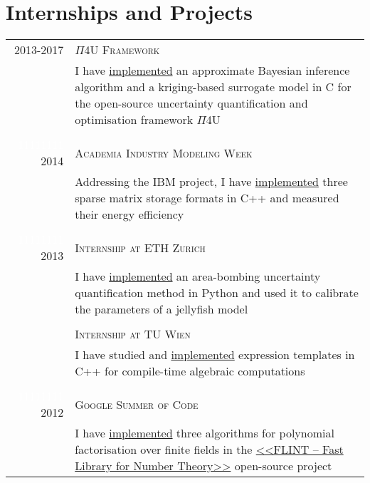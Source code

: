 \documentclass[a4paper,10pt]{article}
\begin{document}
\section{Internships and Projects}
\begin{tabular}{r|p{13cm}}
    2013-2017 & \textsc{$\Pi$4U Framework} \\
    & \footnotesize I have
    \href{http://www.cse-lab.ethz.ch/software/Pi4U}{implemented} an approximate
    Bayesian inference algorithm and a kriging-based surrogate model in C
    for the open-source uncertainty quantification and optimisation framework
    $\Pi$4U \\

    \multicolumn{2}{c}{} \\

    \textcolor{white}{11111111} 2014 & \textsc{Academia Industry Modeling Week} \\
    & \footnotesize Addressing the IBM project, I have
    \href{https://www.dropbox.com/s/wnojo78rzahemeu/ETH_AIM_2014_presentation.pdf}
    {implemented} three sparse matrix storage formats in C++ and measured their
    energy efficiency \\

    \multicolumn{2}{c}{} \\

    \textcolor{white}{11111111} 2013 & \textsc{Internship at ETH Zurich} \\
    & \footnotesize I have
    \href{https://bitbucket.org/lina_kulakova/jellinder.git}{implemented} an
    area-bombing uncertainty quantification method in Python and used it to
    calibrate the parameters of a jellyfish model \\
    & \\
    & \textsc{Internship at TU Wien} \\
    & \footnotesize I have studied and
    \href{https://github.com/lina-kulakova/TU-Wien}{implemented} expression
    templates in C++ for compile-time algebraic computations \\

    \multicolumn{2}{c}{} \\

    \textcolor{white}{11111111} 2012 &
    \textsc{Google Summer of Code}\\
    & \footnotesize{I have
    \href{https://github.com/lina-kulakova/flint2}{implemented} three
    algorithms for polynomial factorisation over finite fields in the
    \href{http://flintlib.org}{<<FLINT -- Fast Library for Number Theory>>}
    open-source project}
\end{tabular}
\end{document}

